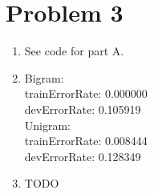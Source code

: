 \documentclass[12pt]{article}
\begin{document}
\section*{Problem 3}

\begin{enumerate}[label=(\alph*)]
  \item See code for part A.

  \item 
  Bigram:\\
  trainErrorRate: 0.000000\\
	devErrorRate: 0.105919\\
	Unigram:\\
	trainErrorRate: 0.008444\\
	devErrorRate: 0.128349
\item TODO
\end{enumerate}
\end{document}
